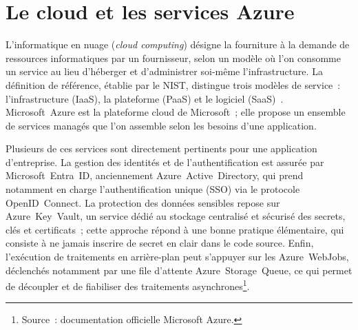 \section{Le cloud et les services Azure}
\label{sec:azure}

L'informatique en nuage (\textit{cloud computing}) désigne la fourniture à la
demande de ressources informatiques par un fournisseur, selon un modèle où l'on
consomme un service au lieu d'héberger et d'administrer soi-même
l'infrastructure. La définition de référence, établie par le NIST, distingue
trois modèles de service~: l'infrastructure (IaaS), la plateforme (PaaS) et le
logiciel (SaaS)~\cite{nist2011cloud}. Microsoft~Azure est la plateforme cloud de
Microsoft~; elle propose un ensemble de services managés que l'on assemble selon
les besoins d'une application.

Plusieurs de ces services sont directement pertinents pour une application
d'entreprise. La gestion des identités et de l'authentification est assurée par
Microsoft~Entra~ID, anciennement Azure~Active~Directory, qui prend notamment en
charge l'authentification unique (SSO) via le protocole OpenID~Connect.
La protection des données sensibles repose sur
Azure~Key~Vault, un service dédié au stockage centralisé et sécurisé des secrets,
clés et certificats~; cette approche répond à une bonne
pratique élémentaire, qui consiste à ne jamais inscrire de secret en clair dans
le code source. Enfin, l'exécution de traitements en arrière-plan peut s'appuyer
sur les Azure~WebJobs, déclenchés notamment par une file d'attente
Azure~Storage~Queue, ce qui permet de découpler et de fiabiliser des traitements
asynchrones\footnote{Source~: documentation officielle Microsoft Azure.}.

